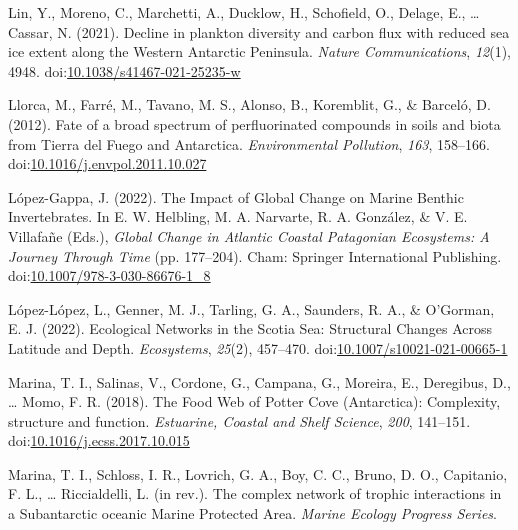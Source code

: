 \documentclass[
]{article}
\newlength{\cslhangindent}
\newlength{\cslentryspacingunit} %
\newenvironment{CSLReferences}[2] %
 {%
  \setlength{\parindent}{0pt}
  \ifodd #1
  \let\oldpar\par
  \def\par{\hangindent=\cslhangindent\oldpar}
  \fi
  \setlength{\parskip}{#2\cslentryspacingunit}
 }%
 {}
\begin{document}
\begin{CSLReferences}{1}{0}
\leavevmode{}%
Lin, Y., Moreno, C., Marchetti, A., Ducklow, H., Schofield, O., Delage,
E., \ldots{} Cassar, N. (2021). Decline in plankton diversity and carbon
flux with reduced sea ice extent along the {Western Antarctic
Peninsula}. \emph{Nature Communications}, \emph{12}(1), 4948.
doi:\href{https://doi.org/10.1038/s41467-021-25235-w}{10.1038/s41467-021-25235-w}

\leavevmode{}%
Llorca, M., Farré, M., Tavano, M. S., Alonso, B., Koremblit, G., \&
Barceló, D. (2012). Fate of a broad spectrum of perfluorinated compounds
in soils and biota from {Tierra} del {Fuego} and {Antarctica}.
\emph{Environmental Pollution}, \emph{163}, 158--166.
doi:\href{https://doi.org/10.1016/j.envpol.2011.10.027}{10.1016/j.envpol.2011.10.027}

\leavevmode{}%
López-Gappa, J. (2022). The {Impact} of {Global Change} on {Marine
Benthic Invertebrates}. In E. W. Helbling, M. A. Narvarte, R. A.
González, \& V. E. Villafañe (Eds.), \emph{Global {Change} in {Atlantic
Coastal Patagonian Ecosystems}: {A Journey Through Time}} (pp.
177--204). {Cham}: {Springer International Publishing}.
doi:\href{https://doi.org/10.1007/978-3-030-86676-1_8}{10.1007/978-3-030-86676-1\_8}

\leavevmode{}%
López-López, L., Genner, M. J., Tarling, G. A., Saunders, R. A., \&
O'Gorman, E. J. (2022). Ecological {Networks} in the {Scotia Sea}:
{Structural Changes Across Latitude} and {Depth}. \emph{Ecosystems},
\emph{25}(2), 457--470.
doi:\href{https://doi.org/10.1007/s10021-021-00665-1}{10.1007/s10021-021-00665-1}

\leavevmode{}%
Marina, T. I., Salinas, V., Cordone, G., Campana, G., Moreira, E.,
Deregibus, D., \ldots{} Momo, F. R. (2018). The {Food Web} of {Potter
Cove} ({Antarctica}): Complexity, structure and function.
\emph{Estuarine, Coastal and Shelf Science}, \emph{200}, 141--151.
doi:\href{https://doi.org/10.1016/j.ecss.2017.10.015}{10.1016/j.ecss.2017.10.015}

\leavevmode{}%
Marina, T. I., Schloss, I. R., Lovrich, G. A., Boy, C. C., Bruno, D. O.,
Capitanio, F. L., \ldots{} Riccialdelli, L. (in rev.). The complex
network of trophic interactions in a {Subantarctic} oceanic {Marine
Protected Area}. \emph{Marine Ecology Progress Series}.


\end{CSLReferences}
\end{document}
